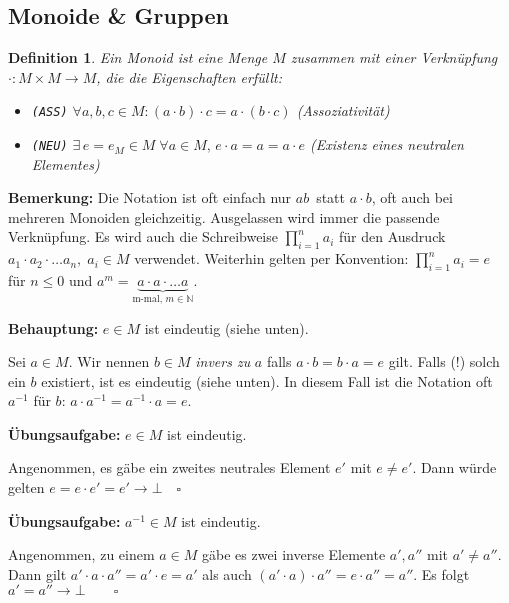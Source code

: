 \documentclass[10pt,a4paper]{article}
\newtheorem{defi}{Definition}
\begin{document}
\subsection{Monoide \& Gruppen}

\begin{defi}
	Ein \emph{Monoid} ist eine Menge $M$ zusammen mit einer Verknüpfung $\cdot : M \times M \to M$,
	die die Eigenschaften erfüllt:
	\begin{itemize}
		\item \emph{\texttt{(ASS)}} $\forall a,b,c \in M: (a \cdot b) \cdot c = a \cdot (b \cdot c)$ (Assoziativität)
		\item \emph{\texttt{(NEU)}} $\exists\, e = e_M \in M \; \forall a \in M,\, e \cdot a = a = a \cdot e$ (Existenz
	eines neutralen Elementes)
	\end{itemize} 
\end{defi}

\textbf{Bemerkung:} Die Notation ist oft einfach nur \glqq $ab$\grqq\ statt \glqq $a \cdot b$\grqq , oft auch bei mehreren Monoiden gleichzeitig. Ausgelassen wird immer die passende Verknüpfung. Es wird auch die Schreibweise $\prod_{i=1}^{n} a_i$ für den Ausdruck $a_1 \cdot a_2 \cdot \dots a_n,\; a_i \in M$ verwendet. Weiterhin gelten per Konvention: $\prod_{i=1}^{n} a_i = e$ für $n \leq 0$ und $a^m = \underbrace{a \cdot a \cdot \dots a}_{\text{m-mal, } m \in \mathbb{N}}$.

\textbf{Behauptung:} $e \in M$ ist eindeutig (siehe unten).\bigskip

Sei $a \in M$. Wir nennen $b \in M$ \emph{invers zu} $a$ falls $a \cdot b = b \cdot a = e$ gilt. Falls (!) solch ein $b$ existiert, ist es eindeutig (siehe unten). In diesem Fall ist die Notation oft $a^{-1}$ für $b$: $a \cdot a^{-1} = a^{-1} \cdot a = e$.\bigskip

\begin{multicols}{2}

\textbf{Übungsaufgabe:} $e \in M$ ist eindeutig.\bigskip

Angenommen, es gäbe ein zweites neutrales Element $e'$ mit $e \neq e'$. Dann würde gelten $e = e \cdot e' = e' \rightarrow \bot \quad \square$

\columnbreak

\textbf{Übungsaufgabe:} $a^{-1} \in M$ ist eindeutig.\bigskip

Angenommen, zu einem $a \in M$ gäbe es zwei inverse Elemente $a', a''$ mit $a' \neq a''$. Dann gilt $a' \cdot a \cdot a''= a' \cdot e = a'$ als auch $(a' \cdot a) \cdot a'' = e \cdot a'' = a''$. Es folgt $a' = a'' \rightarrow \bot \qquad \square$ 

\end{multicols}
\end{document}
